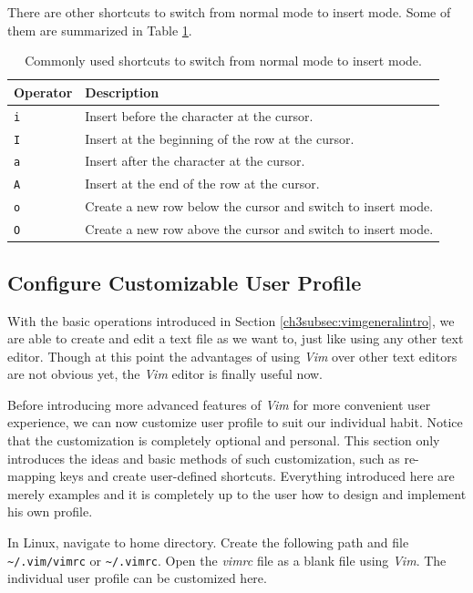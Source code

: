 There are other shortcuts to switch from normal mode to insert mode. Some of them are summarized in Table \ref{ch3tab:switchtoinsert}.

\begin{table}
  \centering \caption{Commonly used shortcuts to switch from normal mode to insert mode.}\label{ch3tab:switchtoinsert}
  \begin{tabularx}{\textwidth}{lX}
    \hline
    Operator & Description \\ \hline
    \verb|i| & Insert before the character at the cursor. \\ \hdashline
    \verb|I| & Insert at the beginning of the row at the cursor. \\ \hdashline
    \verb|a| & Insert after the character at the cursor. \\ \hdashline
    \verb|A| & Insert at the end of the row at the cursor. \\ \hdashline
    \verb|o| & Create a new row below the cursor and switch to insert mode. \\ \hdashline
    \verb|O| & Create a new row above the cursor and switch to insert mode. \\ 
    \hline
  \end{tabularx}
\end{table}

\subsection{Configure Customizable User Profile}

With the basic operations introduced in Section \ref{ch3subsec:vimgeneralintro}, we are able to create and edit a text file as we want to, just like using any other text editor. Though at this point the advantages of using \textit{Vim} over other text editors are not obvious yet, the \textit{Vim} editor is finally useful now.

Before introducing more advanced features of \textit{Vim} for more convenient user experience, we can now customize user profile to suit our individual habit. Notice that the customization is completely optional and personal. This section only introduces the ideas and basic methods of such customization, such as re-mapping keys and create user-defined shortcuts. Everything introduced here are merely examples and it is completely up to the user how to design and implement his own profile.

In Linux, navigate to home directory. Create the following path and file \verb|~/.vim/vimrc| or \verb|~/.vimrc|. Open the \textit{vimrc} file as a blank file using \textit{Vim}. The individual user profile can be customized here.

